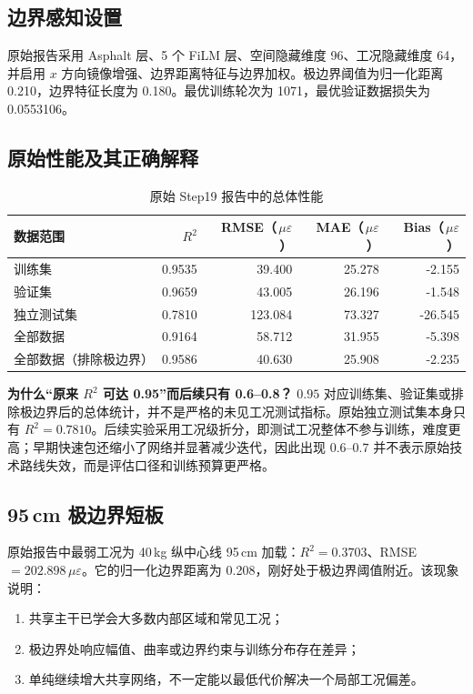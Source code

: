 \documentclass[11pt,a4paper]{article}
\newcommand{\ue}{\,\mu\varepsilon}
\begin{document}
\subsection{边界感知设置}

原始报告采用 Asphalt 层、5 个 FiLM 层、空间隐藏维度 96、工况隐藏维度 64，并启用 $x$ 方向镜像增强、边界距离特征与边界加权。极边界阈值为归一化距离 0.210，边界特征长度为 0.180。最优训练轮次为 1071，最优验证数据损失为 0.0553106。

\subsection{原始性能及其正确解释}

\begin{table}[H]
\centering
\caption{原始 Step19 报告中的总体性能}
\label{tab:step19}
\begin{tabular}{lrrrr}
\toprule
数据范围 & $R^2$ & RMSE（$\ue$） & MAE（$\ue$） & Bias（$\ue$）\\
\midrule
训练集 & 0.9535 & 39.400 & 25.278 & -2.155\\
验证集 & 0.9659 & 43.005 & 26.196 & -1.548\\
独立测试集 & 0.7810 & 123.084 & 73.327 & -26.545\\
全部数据 & 0.9164 & 58.712 & 31.955 & -5.398\\
全部数据（排除极边界） & 0.9586 & 40.630 & 25.908 & -2.235\\
\bottomrule
\end{tabular}
\end{table}

\begin{warningbox}
\textbf{为什么“原来 $R^2$ 可达 0.95”而后续只有 0.6--0.8？}
$0.95$ 对应训练集、验证集或排除极边界后的总体统计，并不是严格的未见工况测试指标。原始独立测试集本身只有 $R^2=0.7810$。后续实验采用工况级折分，即测试工况整体不参与训练，难度更高；早期快速包还缩小了网络并显著减少迭代，因此出现 $0.6$--$0.7$ 并不表示原始技术路线失效，而是评估口径和训练预算更严格。
\end{warningbox}

\subsection{95\,cm 极边界短板}

原始报告中最弱工况为 40\,kg 纵中心线 95\,cm 加载：$R^2=0.3703$、RMSE $=202.898\ue$。它的归一化边界距离为 0.208，刚好处于极边界阈值附近。该现象说明：

\begin{enumerate}
  \item 共享主干已学会大多数内部区域和常见工况；
  \item 极边界处响应幅值、曲率或边界约束与训练分布存在差异；
  \item 单纯继续增大共享网络，不一定能以最低代价解决一个局部工况偏差。
\end{enumerate}
\end{document}
